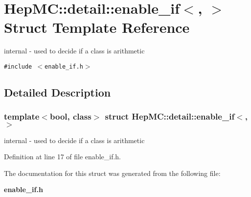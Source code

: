 \section{Hep\-MC::detail::enable\_\-if$<$, $>$ Struct Template Reference}
\label{structHepMC_1_1detail_1_1enable__if}
internal - used to decide if a class is arithmetic  


{\tt \#include $<$enable\_\-if.h$>$}



\subsection{Detailed Description}
\subsubsection*{template$<$bool, class$>$ struct Hep\-MC::detail::enable\_\-if$<$, $>$}

internal - used to decide if a class is arithmetic 



Definition at line 17 of file enable\_\-if.h.

The documentation for this struct was generated from the following file:\begin{CompactItemize}
\item 
{\bf enable\_\-if.h}\end{CompactItemize}
